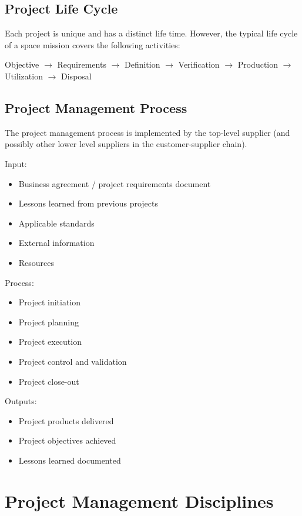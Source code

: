 \subsection{Project Life Cycle}

Each project is unique and has a distinct life time. However, the typical life cycle of a space mission covers the following activities:

Objective 
$\rightarrow$ Requirements
$\rightarrow$ Definition
$\rightarrow$ Verification
$\rightarrow$ Production
$\rightarrow$ Utilization
$\rightarrow$ Disposal

\subsection{Project Management Process}

The project management process is implemented by the top-level supplier (and possibly other lower level suppliers in the customer-supplier chain).

Input: 
\begin{itemize}
\item Business agreement / project requirements document
\item Lessons learned from previous projects
\item Applicable standards
\item External information
\item Resources 
\end{itemize}

Process:
\begin{itemize}
\item Project initiation
\item Project planning
\item Project execution
\item Project control and validation
\item Project close-out
\end{itemize}

Outputs:
\begin{itemize}
\item Project products delivered
\item Project objectives achieved 
\item Lessons learned documented
\end{itemize}

\section{Project Management Disciplines}

